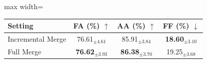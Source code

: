 \renewcommand{\arraystretch}{0.95}
\begin{adjustbox}{max width=\textwidth}
\footnotesize
\begin{tabular}{l c c c}
\toprule
Setting & \textbf{FA (\%)} $\uparrow$ & \textbf{AA (\%)} $\uparrow$ & \textbf{FF (\%)} $\downarrow$ \\
\midrule
Incremental Merge & 76.61$_{\pm 4.61}$ & 85.91$_{\pm 3.84}$ & \textbf{18.60}$_{\pm 3.10}$ \\
Full Merge & \textbf{76.62}$_{\pm 3.93}$ & \textbf{86.38}$_{\pm 3.70}$ & 19.25$_{\pm 3.68}$ \\
\bottomrule
\end{tabular}
\end{adjustbox}